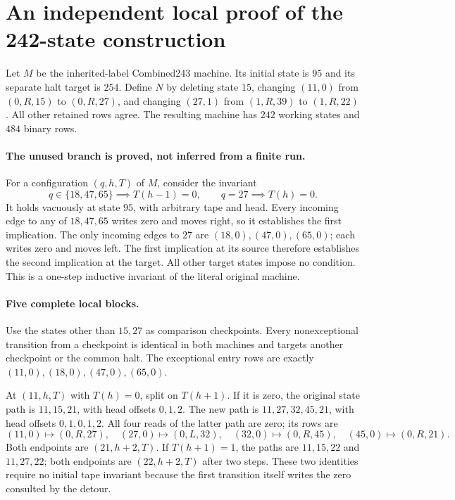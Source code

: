 \section{An independent local proof of the 242-state construction}

Let $M$ be the inherited-label Combined243 machine. Its initial state is
$95$ and its separate halt target is $254$. Define $N$ by deleting state
$15$, changing $(11,0)$ from $(0,R,15)$ to $(0,R,27)$, and changing
$(27,1)$ from $(1,R,39)$ to $(1,R,22)$. All other retained rows agree.
The resulting machine has $242$ working states and $484$ binary rows.

\paragraph{The unused branch is proved, not inferred from a finite run.}
For a configuration $(q,h,T)$ of $M$, consider the invariant
\[
q\in\{18,47,65\}\implies T(h-1)=0,
\qquad q=27\implies T(h)=0.
\]
It holds vacuously at state $95$, with arbitrary tape and head. Every
incoming edge to any of $18,47,65$ writes zero and moves right, so it
establishes the first implication. The only incoming edges to $27$ are
$(18,0),(47,0),(65,0)$; each writes zero and moves left. The first
implication at its source therefore establishes the second implication
at the target. All other target states impose no condition. This is a
one-step inductive invariant of the literal original machine.

\paragraph{Five complete local blocks.}
Use the states other than $15,27$ as comparison checkpoints. Every
nonexceptional transition from a checkpoint is identical in both
machines and targets another checkpoint or the common halt. The
exceptional entry rows are exactly $(11,0),(18,0),(47,0),(65,0)$.

At $(11,h,T)$ with $T(h)=0$, split on $T(h+1)$. If it is zero, the
original state path is $11,15,21$, with head offsets $0,1,2$. The new
path is $11,27,32,45,21$, with head offsets $0,1,0,1,2$. All four reads
of the latter path are zero; its rows are
\[
(11,0)\mapsto(0,R,27),\quad
(27,0)\mapsto(0,L,32),\quad
(32,0)\mapsto(0,R,45),\quad
(45,0)\mapsto(0,R,21).
\]
Both endpoints are $(21,h+2,T)$. If $T(h+1)=1$, the paths are
$11,15,22$ and $11,27,22$; both endpoints are $(22,h+2,T)$ after two
steps. These two identities require no initial tape invariant because
the first transition itself writes the zero consulted by the detour.

